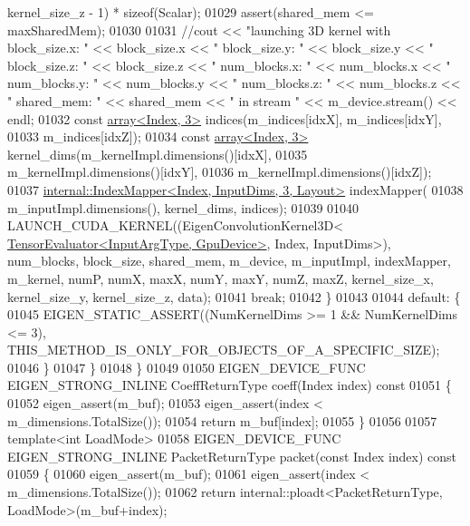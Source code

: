 \begin{DoxyCode}
      kernel\_size\_z - 1) * \textcolor{keyword}{sizeof}(Scalar);
01029         assert(shared\_mem <= maxSharedMem);
01030 
01031         \textcolor{comment}{//cout << "launching 3D kernel with block\_size.x: " << block\_size.x << " block\_size.y: " <<
       block\_size.y  << " block\_size.z: " << block\_size.z << " num\_blocks.x: " << num\_blocks.x << " num\_blocks.y: " <<
       num\_blocks.y << " num\_blocks.z: " << num\_blocks.z  << " shared\_mem: " << shared\_mem << " in stream " <<
       m\_device.stream() << endl;}
01032         \textcolor{keyword}{const} \hyperlink{class_eigen_1_1array}{array<Index, 3>} indices(m\_indices[idxX], m\_indices[idxY],
01033                                       m\_indices[idxZ]);
01034         \textcolor{keyword}{const} \hyperlink{class_eigen_1_1array}{array<Index, 3>} kernel\_dims(m\_kernelImpl.dimensions()[idxX],
01035                                           m\_kernelImpl.dimensions()[idxY],
01036                                           m\_kernelImpl.dimensions()[idxZ]);
01037         \hyperlink{class_eigen_1_1internal_1_1_index_mapper}{internal::IndexMapper<Index, InputDims, 3, Layout>}
       indexMapper(
01038             m\_inputImpl.dimensions(), kernel\_dims, indices);
01039 
01040         LAUNCH\_CUDA\_KERNEL((EigenConvolutionKernel3D<
      \hyperlink{struct_eigen_1_1_tensor_evaluator}{TensorEvaluator<InputArgType, GpuDevice>}, Index, InputDims>), 
      num\_blocks, block\_size, shared\_mem, m\_device, m\_inputImpl, indexMapper, m\_kernel, numP, numX, maxX, numY, maxY, 
      numZ, maxZ, kernel\_size\_x, kernel\_size\_y, kernel\_size\_z, data);
01041         \textcolor{keywordflow}{break};
01042       \}
01043 
01044       \textcolor{keywordflow}{default}: \{
01045         EIGEN\_STATIC\_ASSERT((NumKernelDims >= 1 && NumKernelDims <= 3), 
      THIS\_METHOD\_IS\_ONLY\_FOR\_OBJECTS\_OF\_A\_SPECIFIC\_SIZE);
01046       \}
01047     \}
01048   \}
01049 
01050   EIGEN\_DEVICE\_FUNC EIGEN\_STRONG\_INLINE CoeffReturnType coeff(Index index)\textcolor{keyword}{ const}
01051 \textcolor{keyword}{  }\{
01052     eigen\_assert(m\_buf);
01053     eigen\_assert(index < m\_dimensions.TotalSize());
01054     \textcolor{keywordflow}{return} m\_buf[index];
01055   \}
01056 
01057   \textcolor{keyword}{template}<\textcolor{keywordtype}{int} LoadMode>
01058   EIGEN\_DEVICE\_FUNC EIGEN\_STRONG\_INLINE PacketReturnType packet(\textcolor{keyword}{const} Index index)\textcolor{keyword}{ const}
01059 \textcolor{keyword}{  }\{
01060     eigen\_assert(m\_buf);
01061     eigen\_assert(index < m\_dimensions.TotalSize());
01062     \textcolor{keywordflow}{return} internal::ploadt<PacketReturnType, LoadMode>(m\_buf+index);

\end{DoxyCode}
